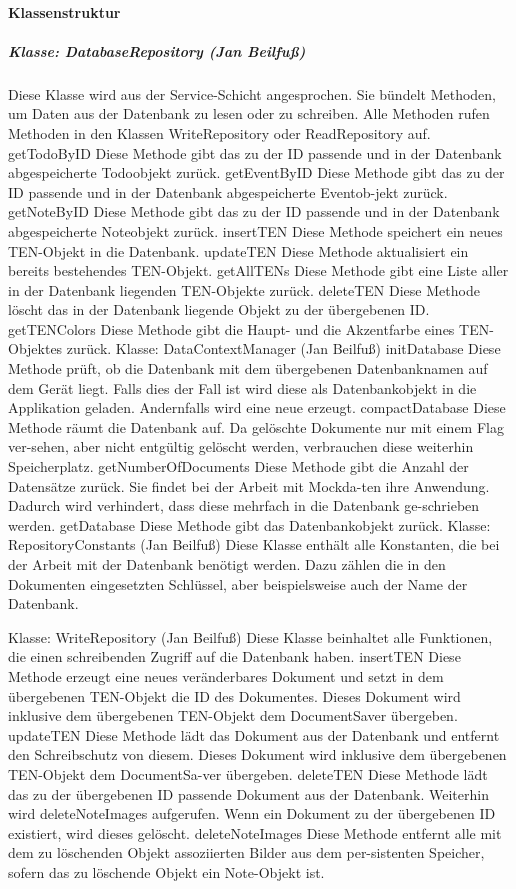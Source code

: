 \paragraph{Klassenstruktur}
\subparagraph{Klasse: DatabaseRepository (Jan Beilfuß)}
Diese Klasse wird aus der Service-Schicht angesprochen. Sie bündelt Methoden, um Daten aus der Datenbank zu lesen oder zu schreiben. Alle Methoden rufen Methoden in den Klassen WriteRepository oder ReadRepository auf.
getTodoByID
Diese Methode gibt das zu der ID passende und in der Datenbank abgespeicherte Todoobjekt zurück. 
getEventByID
Diese Methode gibt das zu der ID passende und in der Datenbank abgespeicherte Eventob-jekt zurück. 
getNoteByID
Diese Methode gibt das zu der ID passende und in der Datenbank abgespeicherte Noteobjekt zurück. 
insertTEN
Diese Methode speichert ein neues TEN-Objekt in die Datenbank.
updateTEN
Diese Methode aktualisiert ein bereits bestehendes TEN-Objekt.
getAllTENs
Diese Methode gibt eine Liste aller in der Datenbank liegenden TEN-Objekte zurück.
deleteTEN
Diese Methode löscht das in der Datenbank liegende Objekt zu der übergebenen ID.
getTENColors
Diese Methode gibt die Haupt- und die Akzentfarbe eines TEN-Objektes zurück.
Klasse: DataContextManager (Jan Beilfuß)
initDatabase
Diese Methode prüft, ob die Datenbank mit dem übergebenen Datenbanknamen auf dem Gerät liegt. Falls dies der Fall ist wird diese als Datenbankobjekt in die Applikation geladen. Andernfalls wird eine neue erzeugt.
compactDatabase
Diese Methode räumt die Datenbank auf. Da gelöschte Dokumente nur mit einem Flag ver-sehen, aber nicht entgültig gelöscht werden, verbrauchen diese weiterhin Speicherplatz.
getNumberOfDocuments
Diese Methode gibt die Anzahl der Datensätze zurück. Sie findet bei der Arbeit mit Mockda-ten ihre Anwendung. Dadurch wird verhindert, dass diese mehrfach in die Datenbank ge-schrieben werden.
getDatabase
Diese Methode gibt das Datenbankobjekt zurück.
Klasse: RepositoryConstants (Jan Beilfuß)
Diese Klasse enthält alle Konstanten, die bei der Arbeit mit der Datenbank benötigt werden. Dazu zählen die in den Dokumenten eingesetzten Schlüssel, aber beispielsweise auch der Name der Datenbank.

Klasse: WriteRepository (Jan Beilfuß)
Diese Klasse beinhaltet alle Funktionen, die einen schreibenden Zugriff auf die Datenbank haben. 
insertTEN
Diese Methode erzeugt eine neues veränderbares Dokument und setzt in dem übergebenen TEN-Objekt die ID des Dokumentes. Dieses Dokument wird inklusive dem übergebenen TEN-Objekt dem DocumentSaver übergeben.
updateTEN
Diese Methode lädt das Dokument aus der Datenbank und entfernt den Schreibschutz von diesem. Dieses Dokument wird inklusive dem übergebenen TEN-Objekt dem DocumentSa-ver übergeben.
deleteTEN
Diese Methode lädt das zu der übergebenen ID passende Dokument aus der Datenbank. Weiterhin wird deleteNoteImages aufgerufen. Wenn ein Dokument zu der übergebenen ID existiert, wird dieses gelöscht.
deleteNoteImages
Diese Methode entfernt alle mit dem zu löschenden Objekt assoziierten Bilder aus dem per-sistenten Speicher, sofern das zu löschende Objekt ein Note-Objekt ist.


